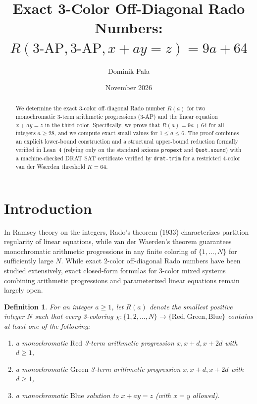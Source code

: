 \documentclass[11pt,a4paper]{article}
\title{Exact 3-Color Off-Diagonal Rado Numbers: \\ $R(\text{3-AP}, \text{3-AP}, x + ay = z) = 9a + 64$}
\author{Dominik Pala}
\date{November 2026}
\newtheorem{definition}[theorem]{Definition}
\begin{document}
\maketitle

\begin{abstract}
We determine the exact 3-color off-diagonal Rado number $R(a)$ for two monochromatic 3-term arithmetic progressions (3-AP) and the linear equation $x + ay = z$ in the third color. Specifically, we prove that $R(a) = 9a + 64$ for all integers $a \ge 28$, and we compute exact small values for $1 \le a \le 6$. The proof combines an explicit lower-bound construction and a structural upper-bound reduction formally verified in Lean~4 (relying only on the standard axioms \texttt{propext} and \texttt{Quot.sound}) with a machine-checked DRAT SAT certificate verified by \texttt{drat-trim} for a restricted 4-color van der Waerden threshold $K = 64$.
\end{abstract}

\section{Introduction}

In Ramsey theory on the integers, Rado's theorem (1933) characterizes partition regularity of linear equations, while van der Waerden's theorem guarantees monochromatic arithmetic progressions in any finite coloring of $\{1, \dots, N\}$ for sufficiently large $N$. While exact 2-color off-diagonal Rado numbers have been studied extensively, exact closed-form formulas for 3-color mixed systems combining arithmetic progressions and parameterized linear equations remain largely open.

\begin{definition}
For an integer $a \ge 1$, let $R(a)$ denote the smallest positive integer $N$ such that every 3-coloring $\chi : \{1, 2, \dots, N\} \to \{\mathrm{Red}, \mathrm{Green}, \mathrm{Blue}\}$ contains at least one of the following:
\begin{enumerate}
    \item a monochromatic $\mathrm{Red}$ 3-term arithmetic progression $x, x+d, x+2d$ with $d \ge 1$,
    \item a monochromatic $\mathrm{Green}$ 3-term arithmetic progression $x, x+d, x+2d$ with $d \ge 1$,
    \item a monochromatic $\mathrm{Blue}$ solution to $x + ay = z$ (with $x = y$ allowed).
\end{enumerate}
\end{definition}
\end{document}
